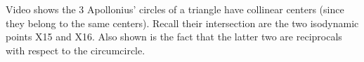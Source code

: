 Video shows the 3 Apollonius' circles of a triangle have collinear centers (since they belong to the same centers). Recall their intersection are the two isodynamic points X15 and X16. Also shown is the fact that the latter two are reciprocals with respect to the circumcircle.
